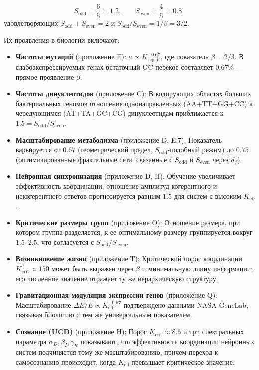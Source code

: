 \documentclass[12pt,a4paper]{article}
\theoremstyle{remark}
\begin{document}
	\[
	S_{\mathrm{odd}} = \frac{6}{5}=1.2,\qquad S_{\mathrm{even}} = \frac{4}{5}=0.8,
	\]
	удовлетворяющих $S_{\mathrm{odd}}+S_{\mathrm{even}}=2$ и $S_{\mathrm{odd}}/S_{\mathrm{even}} = 1/\beta = 3/2$.
	
	Их проявления в биологии включают:
	
	\begin{itemize}
		\item \textbf{Частоты мутаций} (приложение E): $\mu \propto K_{\mathrm{repair}}^{-0.67}$, где показатель $\beta = 2/3$. В слабоэкспрессируемых генах остаточный GC-перекос составляет $0.67\%$ — прямое проявление $\beta$.
		\item \textbf{Частоты динуклеотидов} (приложение C): В кодирующих областях больших бактериальных геномов отношение однонаправленных (AA+TT+GG+CC) к чередующимся (AT+TA+GC+CG) динуклеотидам приближается к $1.5 = S_{\mathrm{odd}}/S_{\mathrm{even}}$.
		\item \textbf{Масштабирование метаболизма} (приложение D, E.7): Показатель варьируется от $0.67$ (геометрический предел, $S_{\mathrm{odd}}$-подобный режим) до $0.75$ (оптимизированные фрактальные сети, связанные с $S_{\mathrm{odd}}$ и $S_{\mathrm{even}}$ через $d_f$).
		\item \textbf{Нейронная синхронизация} (приложение D, H): Обучение увеличивает эффективность координации; отношение амплитуд когерентного и некогерентного ответов прогнозируется равным $1.5$ для систем с высоким $K_{\mathrm{eff}}$.
		\item \textbf{Критические размеры групп} (приложение O): Отношение размера, при котором группа разделяется, к ее оптимальному размеру группируется вокруг $1.5$–$2.5$, что согласуется с $S_{\mathrm{odd}}/S_{\mathrm{even}}$.
		\item \textbf{Возникновение жизни} (приложение T): Критический порог координации $K_{\mathrm{crit}} \approx 150$ может быть выражен через $\beta$ и минимальную длину информации; его численное значение отражает ту же иерархическую структуру.
		\item \textbf{Гравитационная модуляция экспрессии генов} (приложение Q): Масштабирование $\Delta E/E \propto K_{\mathrm{eff}}^{-0.67}$ подтверждено данными NASA GeneLab, связывая биологию с тем же универсальным показателем.
		\item \textbf{Сознание (UCD)} (приложение H): Порог $K_{\mathrm{crit}} \approx 8.5$ и три спектральных параметра $\alpha_D,\beta_I,\gamma_R$ показывают, что эффективность координации нейронных систем подчиняется тому же масштабированию, причем переход к самосознанию происходит, когда $K_{\mathrm{eff}}$ превышает критическое значение.
	\end{itemize}
	
\end{document}
